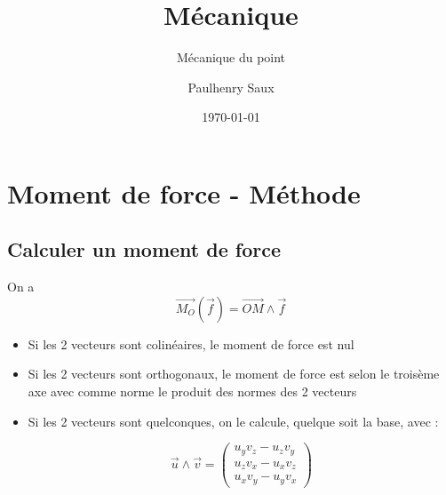 \documentclass[french]{yLectureNote}
\title{Mécanique}
\subtitle{Mécanique du point}
\author{Paulhenry Saux}
\date{\today}
\renewcommand{\vec}{\overrightarrow}
\begin{document}
\setcounter{chapter}{2}
	\chapter{Moment de force - Méthode}
	\section{Calculer un moment de force}
	On a \[\vec{M_O}(\vec{f}) = \vec{OM}\wedge \vec{f}\]
	\begin{itemize}
	 \item Si les 2 vecteurs sont colinéaires, le moment de force est nul
	 \item Si les 2 vecteurs sont orthogonaux, le moment de force est selon le troisème axe avec comme norme le produit des normes des 2 vecteurs
	 \item Si les 2 vecteurs sont quelconques, on le calcule, quelque soit la base, avec :

	 \[\vec{u}\wedge \vec{v}=\begin{pmatrix}
u_yv_z-u_zv_y\\
u_zv_x-u_xv_z\\
u_xv_y-u_yv_x
\end{pmatrix}\]
	\end{itemize}
\end{document}
